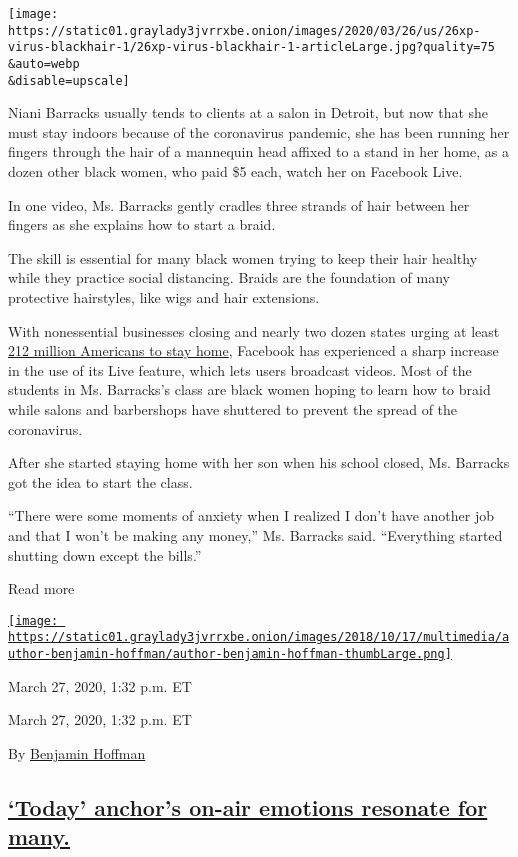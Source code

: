 \texttt{[image: https://static01.graylady3jvrrxbe.onion/images/2020/03/26/us/26xp-virus-blackhair-1/26xp-virus-blackhair-1-articleLarge.jpg?quality=75\\\&auto=webp\\\&disable=upscale]}

Niani Barracks usually tends to clients at a salon in Detroit, but now
that she must stay indoors because of the coronavirus pandemic, she has
been running her fingers through the hair of a mannequin head affixed to
a stand in her home, as a dozen other black women, who paid \$5 each,
watch her on Facebook Live.

In one video, Ms. Barracks gently cradles three strands of hair between
her fingers as she explains how to start a braid.

The skill is essential for many black women trying to keep their hair
healthy while they practice social distancing. Braids are the foundation
of many protective hairstyles, like wigs and hair extensions.

With nonessential businesses closing and nearly two dozen states urging
at least
\href{https://www.nytimes3xbfgragh.onion/interactive/2020/us/coronavirus-stay-at-home-order.html}{212
million Americans to stay home}, Facebook has experienced a sharp
increase in the use of its Live feature, which lets users broadcast
videos. Most of the students in Ms. Barracks's class are black women
hoping to learn how to braid while salons and barbershops have shuttered
to prevent the spread of the coronavirus.

After she started staying home with her son when his school closed, Ms.
Barracks got the idea to start the class.

``There were some moments of anxiety when I realized I don't have
another job and that I won't be making any money,'' Ms. Barracks said.
``Everything started shutting down except the bills.''

Read more

\href{https://www.nytimes3xbfgragh.onion/by/benjamin-hoffman}{\texttt{[image: https://static01.graylady3jvrrxbe.onion/images/2018/10/17/multimedia/author-benjamin-hoffman/author-benjamin-hoffman-thumbLarge.png]}}

March 27, 2020, 1:32 p.m. ET

March 27, 2020, 1:32 p.m. ET

By
\href{https://www.nytimes3xbfgragh.onion/by/benjamin-hoffman}{Benjamin
Hoffman}

\hypertarget{today-anchors-on-air-emotions-resonate-for-many}{%
\subsection{\texorpdfstring{\protect\hyperlink{today-anchors-on-air-emotions-resonate-for-many}{`Today'
anchor's on-air emotions resonate for
many.}}{`Today' anchor's on-air emotions resonate for many.}}\label{today-anchors-on-air-emotions-resonate-for-many}}

